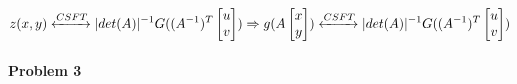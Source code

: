 \documentclass[11pt]{article}
\begin{document}
\begin{equation*}
\begin{split}
    z(x,y) \xleftrightarrow{CSFT} 
    |det(A)|^{-1}G((A^{-1})^T\begin{bmatrix}
        u \\ v
    \end{bmatrix})
\Rightarrow g(A\begin{bmatrix}
    x \\ y
\end{bmatrix})
 \xleftrightarrow{CSFT} 
 |det(A)|^{-1}G((A^{-1})^T\begin{bmatrix}
    u \\ v
\end{bmatrix})
\end{split}
\end{equation*}
\paragraph{\noindent\textbf{\LARGE{Problem 3}}}
\end{document}
